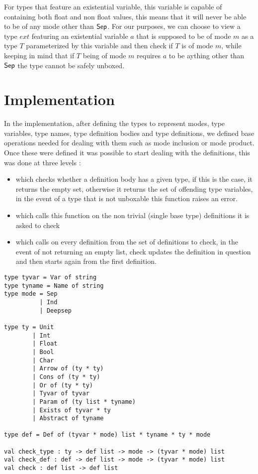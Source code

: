 \documentclass[a4]{article}
\begin{document}
For types that feature an existential variable, this variable is capable of containing both float and non float values, this means that it will never be able to be of any mode other than $\mathsf{Sep}$. For our purposes, we can choose to view a type $ext$ featuring an existential variable $a$ that is supposed to be of mode $m$ as a type $T$ parameterized by this variable and then check if $T$ is of mode $m$, while keeping in mind that if $T$ being of mode $m$ requires $a$ to be aything other than $\mathsf{Sep}$ the type cannot be safely unboxed.

\section{Implementation}

In the implementation, after defining the types to represent modes, type variables, type names, type definition bodies and type definitions, we defined base operations needed for dealing with them such as mode inclusion or mode product. Once these were defined it was possible to start dealing with the definitions, this was done at three levels :
\begin{itemize}
\item {} which checks whether a definition body has a given type, if this is the case, it returns the empty set, otherwise it returns the set of offending type variables, in the event of a type that is not unboxable this function raises an error.
\item {} which calls this function on the non trivial (single base type) definitions it is asked to check
\item {} which calls  on every definition from the set of definitions to check, in the event of  not returning an empty list, check updates the definition in question and then starts again from the first definition.
\end{itemize}

\begin{lstlisting}
type tyvar = Var of string
type tyname = Name of string
type mode = Sep
          | Ind
          | Deepsep

type ty = Unit
        | Int
        | Float
        | Bool
        | Char
        | Arrow of (ty * ty)
        | Cons of (ty * ty)
        | Or of (ty * ty)
        | Tyvar of tyvar
        | Param of (ty list * tyname)
        | Exists of tyvar * ty
        | Abstract of tyname

type def = Def of (tyvar * mode) list * tyname * ty * mode

val check_type : ty -> def list -> mode -> (tyvar * mode) list
val check_def : def -> def list -> mode -> (tyvar * mode) list
val check : def list -> def list
\end{lstlisting}
\end{document}
